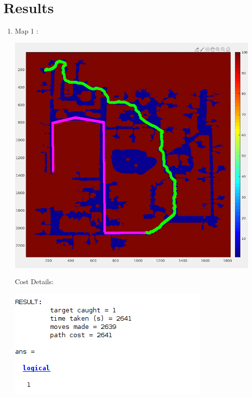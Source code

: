 \documentclass[12pt]{article}
\begin{document}
\section*{Results}
\begin{enumerate}
    \item Map 1 : 
    \begin{center}
    \includegraphics[scale = 0.4]{16782_HW1_fall19_v2/pictures/map1.png} \\
    \end{center}
    
    Cost Details:
    \begin{center}
    \includegraphics[scale = 0.6]{16782_HW1_fall19_v2/pictures/map1_cost.png} \\
    \end{center}
    
    \pagebreak
    

\end{enumerate}
\end{document}
